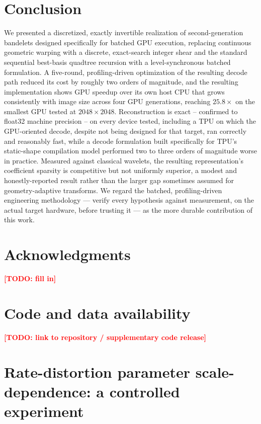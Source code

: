\documentclass[11pt]{article}
\newcommand{\todo}[1]{\textcolor{red}{\textbf{[TODO: #1]}}}
\begin{document}
\section{Conclusion}
\label{sec:conclusion}

We presented a discretized, exactly invertible realization of
second-generation bandelets designed specifically for batched GPU execution,
replacing continuous geometric warping with a discrete, exact-search integer
shear and the standard sequential best-basis quadtree recursion with a
level-synchronous batched formulation. A five-round, profiling-driven
optimization of the resulting decode path reduced its cost by roughly two
orders of magnitude, and the resulting implementation shows GPU speedup
over its own host CPU that grows consistently with image size across four
GPU generations, reaching $25.8\times$ on the smallest GPU tested at
$2048\times2048$. Reconstruction is exact -- confirmed to float32 machine
precision -- on every device tested, including a TPU on which the
GPU-oriented decode, despite not being designed for that target, ran
correctly and reasonably fast, while a decode formulation built specifically
for TPU's static-shape compilation model performed two to three orders of
magnitude worse in practice. Measured against classical wavelets, the
resulting representation's coefficient sparsity is competitive but not
uniformly superior, a modest and honestly-reported result rather than the
larger gap sometimes assumed for geometry-adaptive transforms. We regard the
batched, profiling-driven engineering methodology --- verify every
hypothesis against measurement, on the actual target hardware, before
trusting it --- as the more durable contribution of this work.

\section*{Acknowledgments}
\todo{fill in}

\section*{Code and data availability}
\todo{link to repository / supplementary code release}

\appendix

\section{Rate-distortion parameter scale-dependence: a controlled
experiment}
\label{app:scale}
\end{document}
